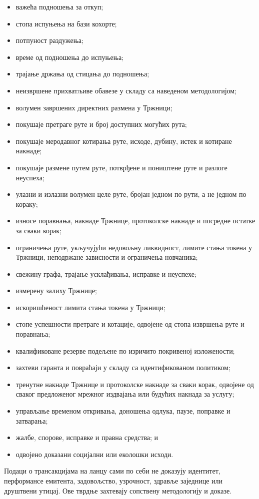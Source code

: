 \documentclass[11pt]{article}
\begin{document}
\begin{itemize}[leftmargin=*]
\item важећа подношења за откуп;
\item стопа испуњења на бази кохорте;
\item потпуност раздужења;
\item време од подношења до испуњења;
\item трајање држања од стицања до подношења;
\item неизвршене прихватљиве обавезе у складу са наведеном методологијом;
\item волумен завршених директних размена у Тржници;
\item покушаје претраге руте и број доступних могућих рута;
\item покушаје меродавног котирања руте, исходе, дубину, истек и котиране накнаде;
\item покушаје размене путем руте, потврђене и поништене руте и разлоге неуспеха;
\item улазни и излазни волумен целе руте, бројан једном по рути, а не једном по кораку;
\item износе поравнања, накнаде Тржнице, протоколске накнаде и посредне остатке за сваки корак;
\item ограничења руте, укључујући недовољну ликвидност, лимите стања токена у Тржници, неподржане зависности и ограничења новчаника;
\item свежину графа, трајање усклађивања, исправке и неуспехе;
\item измерену залиху Тржнице;
\item искоришћеност лимита стања токена у Тржници;
\item стопе успешности претраге и котације, одвојене од стопа извршења руте и поравнања;
\item квалификоване резерве подељене по изричито покривеној изложености;
\item захтеви гаранта и повраћаји у складу са идентификованом политиком;
\item тренутне накнаде Тржнице и протоколске накнаде за сваки корак, одвојене од сваког предложеног мрежног издвајања или будућих накнада за услугу;
\item управљање временом откривања, доношења одлука, паузе, поправке и затварања;
\item жалбе, спорове, исправке и правна средства; и
\item одвојено доказани социјални или еколошки исходи.
\end{itemize}
Подаци о трансакцијама на ланцу сами по себи не доказују идентитет, перформансе емитента, задовољство, узрочност, здравље заједнице или друштвени утицај. Ове тврдње захтевају сопствену методологију и доказе.
\end{document}
